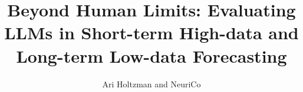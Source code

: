 \documentclass{article}
\title{Beyond Human Limits: Evaluating LLMs in Short-term High-data and Long-term Low-data Forecasting}
\author{Ari Holtzman and NeuriCo}
\begin{document}
\maketitle

\begin{abstract}

\end{abstract}









\end{document}
